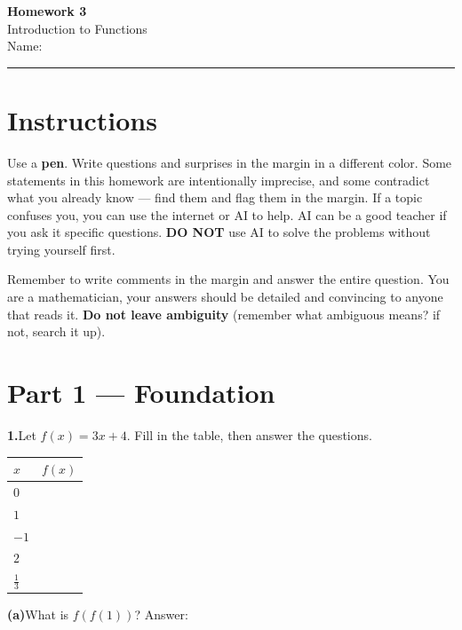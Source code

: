 \documentclass[12pt]{article}
\begin{document}
\pagestyle{fancy}
\begin{center}
  {\Large\bfseries Homework 3}\\[4pt]
  Introduction to Functions\\[6pt]
  Name:\;\underline{\hspace{6.5cm}}\quad
\end{center}
\hrule\bigskip
\section*{Instructions}
Use a \textbf{pen}. Write questions and surprises in the margin in a different color.
Some statements in this homework are intentionally imprecise, and some contradict what you already
know --- find them and flag them in the margin. If a topic confuses you, you can use the internet or AI to
help. AI can be a good teacher if you ask it specific questions. \textbf{DO NOT} use AI to solve the problems
without trying yourself first.

Remember to write comments in the margin and answer the entire question. You are a mathematician, your answers should be detailed and convincing to anyone that reads it. \textbf{Do not leave ambiguity} (remember what ambiguous means? if not, search it up).

\section*{Part 1 --- Foundation}

\textbf{1.}\quad Let $f(x) = 3x + 4$. Fill in the table, then answer the questions.

\medskip
\renewcommand{\arraystretch}{2.4}
\begin{tabular}{|C{4cm}|C{4cm}|}
\hline
$x$ & $f(x)$ \\
\hline
$0$ & \\
\hline
$1$ & \\
\hline
$-1$ & \\
\hline
$2$ & \\
\hline
$\tfrac{1}{3}$ & \\
\hline
\end{tabular}
\renewcommand{\arraystretch}{1}

\medskip
\textbf{(a)}\quad What is $f(f(1))$? \hfill Answer:\;\underline{\hspace{3cm}}
\end{document}
